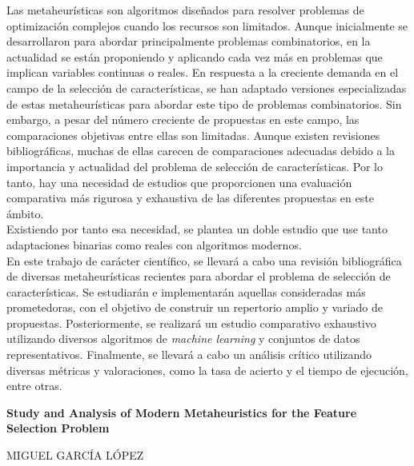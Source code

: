 Las metaheurísticas son algoritmos diseñados para resolver problemas de optimización complejos cuando los recursos son limitados. Aunque inicialmente se desarrollaron para abordar principalmente problemas combinatorios, en la actualidad se están proponiendo y aplicando cada vez más en problemas que implican variables continuas o reales. En respuesta a la creciente demanda en el campo de la selección de características, se han adaptado versiones especializadas de estas metaheurísticas para abordar este tipo de problemas combinatorios. Sin embargo, a pesar del número creciente de propuestas en este campo, las comparaciones objetivas entre ellas son limitadas. Aunque existen revisiones bibliográficas, muchas de ellas carecen de comparaciones adecuadas debido a la importancia y actualidad del problema de selección de características. Por lo tanto, hay una necesidad de estudios que proporcionen una evaluación comparativa más rigurosa y exhaustiva de las diferentes propuestas en este ámbito.\\[6pt]

Existiendo por tanto esa necesidad, se plantea un doble estudio que use tanto adaptaciones binarias como reales con algoritmos modernos.\\[6pt]

En este trabajo de carácter científico, se llevará a cabo una revisión bibliográfica de diversas metaheurísticas recientes para abordar el problema de selección de características. Se estudiarán e implementarán aquellas consideradas más prometedoras, con el objetivo de construir un repertorio amplio y variado de propuestas. Posteriormente, se realizará un estudio comparativo exhaustivo utilizando diversos algoritmos de \textit{machine learning} y conjuntos de datos representativos. Finalmente, se llevará a cabo un análisis crítico utilizando diversas métricas y valoraciones, como la tasa de acierto y el tiempo de ejecución, entre otras.
\cleardoublepage


\thispagestyle{empty}


\begin{center}
       {\large\bfseries Study and Analysis of Modern Metaheuristics for the Feature Selection Problem}\\
\end{center}
\begin{center}
       MIGUEL GARCÍA LÓPEZ\\
\end{center}

\\

